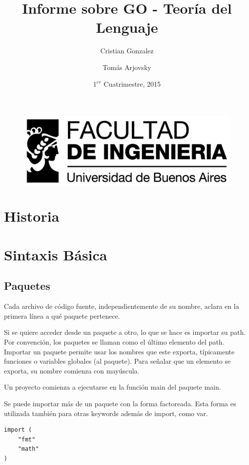 \documentclass{article}
\begin{document}
\begin{figure}
	\centering
	\includegraphics[width=0.9\linewidth]{./logo_fiuba_alta}
	\label{fig:logo_fiuba_alta}
\end{figure}

\title{Informe sobre GO - Teoría del Lenguaje}
\author{Cristian Gonzalez \and Tomás Arjovsky}
\date{1$^{er}$ Cuatrimestre, 2015}
\maketitle
\section{Historia}

\section{Sintaxis Básica}
\subsection{Paquetes}
Cada archivo de código fuente, independientemente de su nombre, aclara en la primera línea a qué paquete pertenece.

Si se quiere acceder desde un paquete a otro, lo que se hace es importar su path. Por convención, los paquetes se llaman como el último elemento del path. Importar un paquete permite usar los nombres que este exporta, típicamente funciones o variables globales (al paquete). Para señalar que un elemento se exporta, su nombre comienza con mayúscula.

Un proyecto comienza a ejecutarse en la función main del paquete main.



Se puede importar más de un paquete con la forma factoreada. Esta forma es utilizada también para otras keywords además de import, como var.

\begin{lstlisting}[caption=Forma Factoreada]
import (
	"fmt" 
	"math"
)
\end{lstlisting}
\end{document}
